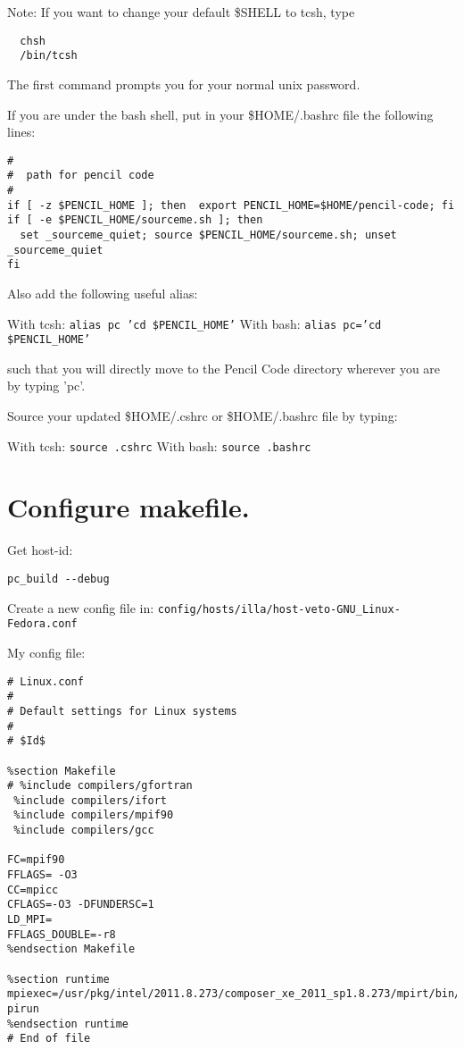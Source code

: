 \documentclass[a4paper,12pt]{article}
\begin{document}
Note: If you want to change your default \$SHELL to tcsh, type

\begin{verbatim}
  chsh
  /bin/tcsh
\end{verbatim}

The first command prompts you for your normal unix password.

If you are under the bash shell, put in your \$HOME/.bashrc file the following
lines:
\begin{verbatim}
#
#  path for pencil code
#
if [ -z $PENCIL_HOME ]; then  export PENCIL_HOME=$HOME/pencil-code; fi
if [ -e $PENCIL_HOME/sourceme.sh ]; then
  set _sourceme_quiet; source $PENCIL_HOME/sourceme.sh; unset _sourceme_quiet
fi
\end{verbatim}

 Also add the following useful alias:

With tcsh: \texttt{alias pc 'cd \$PENCIL\_HOME'}
With bash: \texttt{alias pc='cd \$PENCIL\_HOME'}

such that you will directly move to the Pencil Code directory wherever you are
by typing 'pc'.

Source your updated \$HOME/.cshrc or \$HOME/.bashrc file by typing:

With tcsh: \texttt{source .cshrc}
With bash: \texttt{source .bashrc}

\section{Configure makefile.}

Get host-id:
\begin{verbatim}
pc_build --debug
\end{verbatim}
Create a new config file in:
\texttt{config/hosts/illa/host-veto-GNU\_Linux-Fedora.conf}

My config file:
\begin{verbatim}
# Linux.conf
#
# Default settings for Linux systems
#
# $Id$

%section Makefile
# %include compilers/gfortran
 %include compilers/ifort
 %include compilers/mpif90
 %include compilers/gcc

FC=mpif90 
FFLAGS= -O3  
CC=mpicc 
CFLAGS=-O3 -DFUNDERSC=1 
LD_MPI= 
FFLAGS_DOUBLE=-r8 
%endsection Makefile

%section runtime
mpiexec=/usr/pkg/intel/2011.8.273/composer_xe_2011_sp1.8.273/mpirt/bin/intel64/m
pirun
%endsection runtime
# End of file
\end{verbatim}
\end{document}
